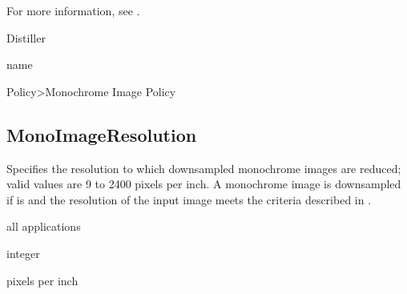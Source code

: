 \documentclass[letterpaper,12pt,english,openany,oneside]{sphinxmanual}
\begin{document}
For more information, see .

\label{\detokenize{PDF_Create_CommonSettings:supported-by-64}}

Distiller

\label{\detokenize{PDF_Create_CommonSettings:type-64}}

name

\label{\detokenize{PDF_Create_CommonSettings:ui-name-50}}

Policy\sphinxhyphen{}>Monochrome Image Policy

\label{\detokenize{PDF_Create_CommonSettings:default-value-60}}

\begin{sphinxVerbatim}[commandchars=\\\{\}]
\end{sphinxVerbatim}




\subsection{MonoImageResolution}
\label{\detokenize{PDF_Create_CommonSettings:monoimageresolution}}
Specifies the resolution to which downsampled monochrome images are reduced; valid values are 9 to 2400 pixels per inch. A monochrome image is downsampled if  is  and the resolution of the input image meets the criteria described in .

\label{\detokenize{PDF_Create_CommonSettings:supported-by-65}}

all applications

\label{\detokenize{PDF_Create_CommonSettings:type-65}}

integer

\label{\detokenize{PDF_Create_CommonSettings:ui-name-51}}

pixels per inch

\label{\detokenize{PDF_Create_CommonSettings:default-value-61}}
\end{document}

